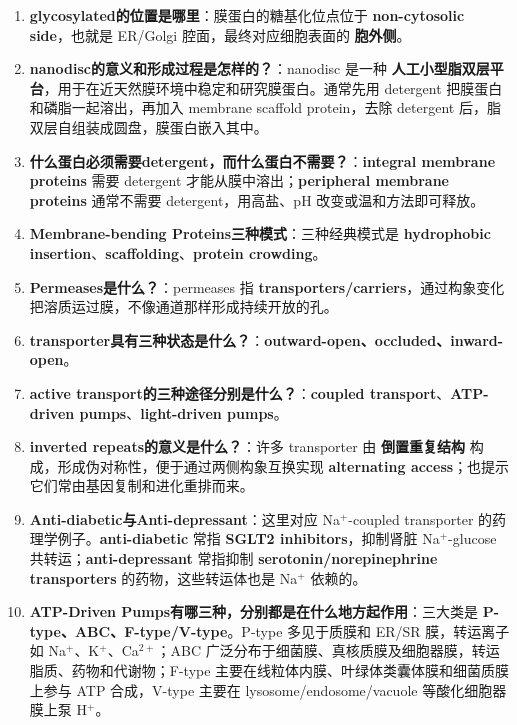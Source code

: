 \documentclass[12pt,fontset=none]{ctexart}
\begin{document}
\begin{enumerate}
\item \textbf{glycosylated的位置是哪里}：膜蛋白的糖基化位点位于 \textbf{non-cytosolic side}，也就是 ER/Golgi 腔面，最终对应细胞表面的 \textbf{胞外侧}。

\item \textbf{nanodisc的意义和形成过程是怎样的？}：nanodisc 是一种 \textbf{人工小型脂双层平台}，用于在近天然膜环境中稳定和研究膜蛋白。通常先用 detergent 把膜蛋白和磷脂一起溶出，再加入 membrane scaffold protein，去除 detergent 后，脂双层自组装成圆盘，膜蛋白嵌入其中。

\item \textbf{什么蛋白必须需要detergent，而什么蛋白不需要？}：\textbf{integral membrane proteins} 需要 detergent 才能从膜中溶出；\textbf{peripheral membrane proteins} 通常不需要 detergent，用高盐、pH 改变或温和方法即可释放。

\item \textbf{Membrane-bending Proteins三种模式}：三种经典模式是 \textbf{hydrophobic insertion}、\textbf{scaffolding}、\textbf{protein crowding}。

\item \textbf{Permeases是什么？}：permeases 指 \textbf{transporters/carriers}，通过构象变化把溶质运过膜，不像通道那样形成持续开放的孔。

\item \textbf{transporter具有三种状态是什么？}：\textbf{outward-open、occluded、inward-open}。

\item \textbf{active transport的三种途径分别是什么？}：\textbf{coupled transport}、\textbf{ATP-driven pumps}、\textbf{light-driven pumps}。

\item \textbf{inverted repeats的意义是什么？}：许多 transporter 由 \textbf{倒置重复结构} 构成，形成伪对称性，便于通过两侧构象互换实现 \textbf{alternating access}；也提示它们常由基因复制和进化重排而来。

\item \textbf{Anti-diabetic与Anti-depressant}：这里对应 Na$^+$-coupled transporter 的药理学例子。\textbf{anti-diabetic} 常指 \textbf{SGLT2 inhibitors}，抑制肾脏 Na$^+$-glucose 共转运；\textbf{anti-depressant} 常指抑制 \textbf{serotonin/norepinephrine transporters} 的药物，这些转运体也是 Na$^+$ 依赖的。

\item \textbf{ATP-Driven Pumps有哪三种，分别都是在什么地方起作用}：三大类是 \textbf{P-type、ABC、F-type/V-type}。P-type 多见于质膜和 ER/SR 膜，转运离子如 Na$^+$、K$^+$、Ca$^{2+}$；ABC 广泛分布于细菌膜、真核质膜及细胞器膜，转运脂质、药物和代谢物；F-type 主要在线粒体内膜、叶绿体类囊体膜和细菌质膜上参与 ATP 合成，V-type 主要在 lysosome/endosome/vacuole 等酸化细胞器膜上泵 H$^+$。


\end{enumerate}
\end{document}
